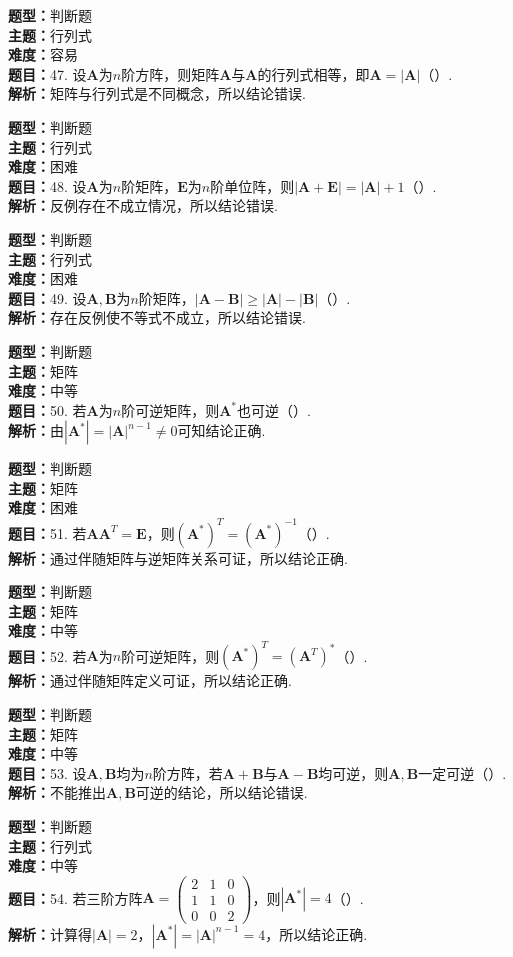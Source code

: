 \documentclass{ctexart}
\newenvironment{question}[5]{%
	\noindent\textbf{题型：}#1\\
	\textbf{主题：}#2\\
	\textbf{难度：}#3\\
	\textbf{题目：}#4\\
	\textbf{解析：}#5\\
	\vspace{1em}
}{}
\begin{document}
	\begin{question}
		{判断题}
		{行列式}
		{容易}
		{47. 设\(\mathbf{A}\)为\(n\)阶方阵，则矩阵\(\mathbf{A}\)与\(\mathbf{A}\)的行列式相等，即\(\mathbf{A}=|\mathbf{A}|\)（）.}
		{矩阵与行列式是不同概念，所以结论错误.}
	\end{question}
	
	\begin{question}
		{判断题}
		{行列式}
		{困难}
		{48. 设\(\mathbf{A}\)为\(n\)阶矩阵，\(\mathbf{E}\)为\(n\)阶单位阵，则\(|\mathbf{A}+\mathbf{E}|=|\mathbf{A}|+1\)（）.}
		{反例存在不成立情况，所以结论错误.}
	\end{question}
	
	\begin{question}
		{判断题}
		{行列式}
		{困难}
		{49. 设\(\mathbf{A},\mathbf{B}\)为\(n\)阶矩阵，\(|\mathbf{A}-\mathbf{B}| \geq |\mathbf{A}|-|\mathbf{B}|\)（）.}
		{存在反例使不等式不成立，所以结论错误.}
	\end{question}
	
	\begin{question}
		{判断题}
		{矩阵}
		{中等}
		{50. 若\(\mathbf{A}\)为\(n\)阶可逆矩阵，则\(\mathbf{A}^*\)也可逆（）.}
		{由\(|\mathbf{A}^*|=|\mathbf{A}|^{n-1}\neq 0\)可知结论正确.}
	\end{question}
	
	\begin{question}
		{判断题}
		{矩阵}
		{困难}
		{51. 若\(\mathbf{AA}^T=\mathbf{E}\)，则\((\mathbf{A}^*)^T=(\mathbf{A}^*)^{-1}\)（）.}
		{通过伴随矩阵与逆矩阵关系可证，所以结论正确.}
	\end{question}
	
	\begin{question}
		{判断题}
		{矩阵}
		{中等}
		{52. 若\(\mathbf{A}\)为\(n\)阶可逆矩阵，则\((\mathbf{A}^*)^T=(\mathbf{A}^T)^*\)（）.}
		{通过伴随矩阵定义可证，所以结论正确.}
	\end{question}
	
	\begin{question}
		{判断题}
		{矩阵}
		{中等}
		{53. 设\(\mathbf{A},\mathbf{B}\)均为\(n\)阶方阵，若\(\mathbf{A}+\mathbf{B}\)与\(\mathbf{A}-\mathbf{B}\)均可逆，则\(\mathbf{A},\mathbf{B}\)一定可逆（）.}
		{不能推出\(\mathbf{A},\mathbf{B}\)可逆的结论，所以结论错误.}
	\end{question}
	
	\begin{question}
		{判断题}
		{行列式}
		{中等}
		{54. 若三阶方阵\(\mathbf{A}=\left(\begin{array}{lll}2 & 1 & 0 \\ 1 & 1 & 0 \\ 0 & 0 & 2\end{array}\right)\)，则\(|\mathbf{A}^*|=4\)（）.}
		{计算得\(|\mathbf{A}|=2\)，\(|\mathbf{A}^*|=|\mathbf{A}|^{n-1}=4\)，所以结论正确.}
	\end{question}
	
\end{document}
